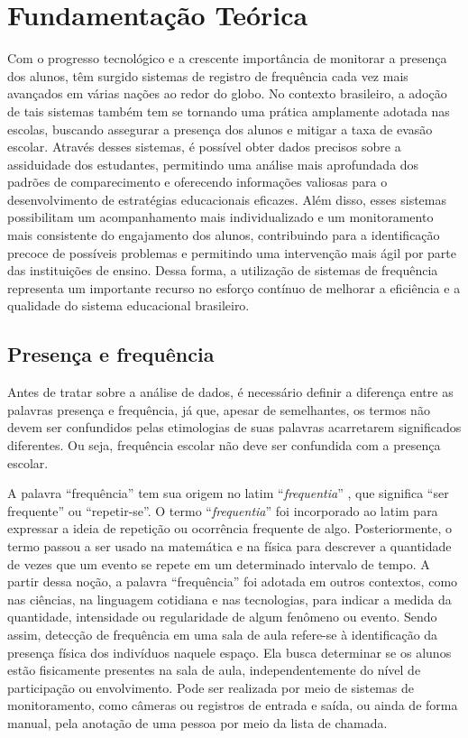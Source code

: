 \chapter{Fundamentação Teórica} 

Com o progresso tecnológico e a crescente importância de monitorar a presença dos alunos, têm surgido sistemas de registro de frequência cada vez mais avançados em várias nações ao redor do globo. No contexto brasileiro, a adoção de tais sistemas também tem se tornando uma prática amplamente adotada nas escolas, buscando assegurar a presença dos alunos e mitigar a taxa de evasão escolar. Através desses sistemas, é possível obter dados precisos sobre a assiduidade dos estudantes, permitindo uma análise mais aprofundada dos padrões de comparecimento e oferecendo informações valiosas para o desenvolvimento de estratégias educacionais eficazes. Além disso, esses sistemas possibilitam um acompanhamento mais individualizado e um monitoramento mais consistente do engajamento dos alunos, contribuindo para a identificação precoce de possíveis problemas e permitindo uma intervenção mais ágil por parte das instituições de ensino. Dessa forma, a utilização de sistemas de frequência representa um importante recurso no esforço contínuo de melhorar a eficiência e a qualidade do sistema educacional brasileiro.

\section{Presença e frequência}

Antes de tratar sobre a análise de dados, é necessário definir a diferença entre as palavras presença e frequência, já que, apesar de semelhantes, os termos não devem ser confundidos pelas etimologias de suas palavras acarretarem significados diferentes. Ou seja, frequência escolar não deve ser confundida com a presença escolar.

A palavra ``frequência'' tem sua origem no latim ``\textit{frequentia}''  \cite{dicionarioëtimologico}, que significa ``ser frequente'' ou ``repetir-se''. O termo ``\textit{frequentia}'' foi incorporado ao latim para expressar a ideia de repetição ou ocorrência frequente de algo. Posteriormente, o termo passou a ser usado na matemática e na física para descrever a quantidade de vezes que um evento se repete em um determinado intervalo de tempo. A partir dessa noção, a palavra ``frequência'' foi adotada em outros contextos, como nas ciências, na linguagem cotidiana e nas tecnologias, para indicar a medida da quantidade, intensidade ou regularidade de algum fenômeno ou evento. Sendo assim,  detecção de frequência em uma sala de aula refere-se à identificação da presença física dos indivíduos naquele espaço. Ela busca determinar se os alunos estão fisicamente presentes na sala de aula, independentemente do nível de participação ou envolvimento. Pode ser realizada por meio de sistemas de monitoramento, como câmeras ou registros de entrada e saída, ou ainda de forma manual, pela anotação de uma pessoa por meio da lista de chamada.

